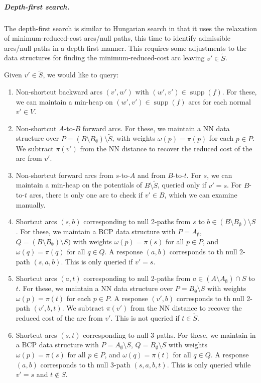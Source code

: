 \documentclass[a4paper,UKenglish]{socg-lipics-v2018}
\def\supp{\operatorname{supp}}
\theoremstyle{plain}
\numberwithin{figure}{section}
\renewcommand{\paragraph}{\subparagraph}
\begin{document}
\paragraph{Depth-first search.}

The depth-first search is similar to Hungarian search in that it
uses the relaxation of minimum-reduced-cost arcs/null paths, this time to
identify admissible arcs/null paths in a depth-first manner.
This requires some adjustments to the data structures for finding the minimum-reduced-cost arc leaving $v' \in \tilde{S}$.

\begin{toappendix}

Given $v' \in \tilde{S}$, we would like to query:
%
\begin{enumerate}
\item Non-shortcut backward arcs $(v', w')$ with $(w', v') \in \supp(f)$.
	For these, we can maintain a min-heap on $(w', v') \in \supp(f)$ arcs
	for each normal $v' \in V$.
\item Non-shortcut $A$-to-$B$ forward arcs.
	For these, we maintain a NN data structure over
	$P = (B \setminus B_\emptyset) \setminus \tilde{S}$, with weights
	$\omega(p) = \pi(p)$ for each $p \in P$.
	We subtract $\pi(v')$ from the NN distance to recover the reduced cost
	of the arc from $v'$.
\item Non-shortcut forward arcs from $s$-to-$A$ and from $B$-to-$t$.
	For $s$, we can maintain a min-heap on the potentials of
	$B \setminus \tilde{S}$, queried only if $v' = s$.
	For $B$-to-$t$ arcs, there is only one arc to check if $v' \in B$,
	which we can examine manually.

\item Shortcut arcs $(s, b)$ corresponding to null 2-paths from $s$ to
	$b \in (B \setminus B_\emptyset) \setminus S$.
	For these, we maintain a BCP data structure with $P = A_\emptyset$,
	$Q = (B \setminus B_\emptyset) \setminus S)$ with weights
	$\omega(p) = \pi(s)$ for all $p \in P$, and $\omega(q) = \pi(q)$ for
	all $q \in Q$.
	A response $(a, b)$ corresponds to th null 2-path $(s, a, b)$.
	This is only queried if $v' = s$.
\item Shortcut arcs $(a, t)$ corresponding to null 2-paths from
	$a \in (A \setminus A_\emptyset) \cap S$ to $t$.
	For these, we maintain a NN data structure over
	$P = B_\emptyset \setminus S$ with weights $\omega(p) = \pi(t)$ for
	each $p \in P$.
	A response $(v', b)$ corresponds to th null 2-path $(v', b, t)$.
	We subtract $\pi(v')$ from the NN distance to recover the reduced cost
	of the arc from $v'$.
	This is not queried if $t \in \tilde{S}$.
\item Shortcut arcs $(s, t)$ corresponding to null 3-paths.
	For these, we maintain in a BCP data structure with
	$P = A_\emptyset \setminus S$, $Q = B_\emptyset \setminus S$ with
	weights $\omega(p) = \pi(s)$ for all
	$p \in P$, and $\omega(q) = \pi(t)$ for all $q \in Q$.
	A response $(a, b)$ corresponds to th null 3-path $(s, a, b, t)$.
	This is only queried while $v' = s$ and $t \not\in S$.
\end{enumerate}

\end{toappendix}
\end{document}

